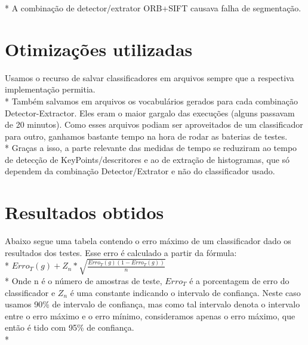 \documentclass[a4paper,11pt]{article}
\begin{document}
* A combinação de detector/extrator ORB+SIFT causava falha de segmentação.

\section{Otimizações utilizadas}
Usamos o recurso de salvar classificadores em arquivos sempre que a respectiva implementação permitia.\\*
Também salvamos em arquivos os vocabulários gerados para cada combinação Detector-Extractor. Eles eram o maior gargalo das execuções (alguns passavam de 20 minutos). Como esses arquivos podiam ser aproveitados de um classificador para outro, ganhamos bastante tempo na hora de rodar as baterias de testes.\\*
Graças a isso, a parte relevante das medidas de tempo se reduziram ao tempo de detecção de KeyPoints/descritores e ao de extração de histogramas, que só dependem da combinação Detector/Extrator e não do classificador usado.

\section{Resultados obtidos}

Abaixo segue uma tabela contendo o erro máximo de um classificador dado os resultados dos testes. Esse erro é calculado a partir da fórmula:\\* $ Erro_T(g)+Z_n * \sqrt{\frac{Erro_T(g)(1 - Erro_T(g))}{n}} $\\*
Onde n é o número de amostras de teste, $Erro_T$ é a porcentagem de erro do classificador e $Z_n$ é uma constante indicando o intervalo de confiança. Neste caso usamos 90\% de intervalo de confiança, mas como tal intervalo denota o intervalo entre o erro máximo e o erro mínimo, consideramos apenas o erro máximo, que então é tido com 95\% de confiança.\\*
\end{document}
